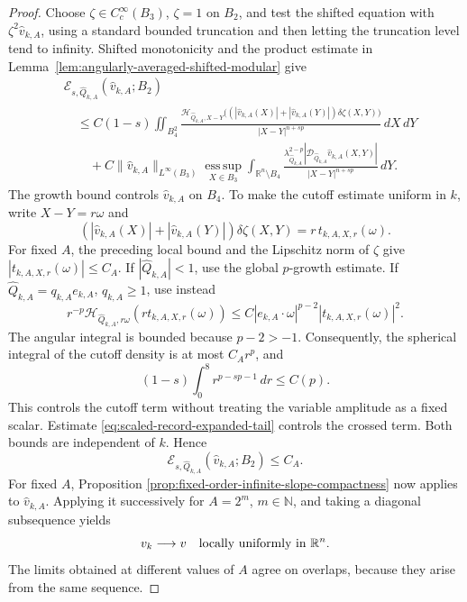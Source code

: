 \documentclass[11pt,reqno]{amsart}
\numberwithin{equation}{section}
\newcommand{\R}{\mathbb R}
\newcommand{\dd}{\,d}
\theoremstyle{remark}
\begin{document}
\begin{proof}
Choose \(\zeta\in C_c^\infty(B_3)\), \(\zeta=1\) on \(B_2\), and test
the shifted equation with
\(\zeta^2\widehat v_{k,A}\), using a standard bounded truncation and
then letting the truncation level tend to infinity.  Shifted
monotonicity and the product estimate in
Lemma~\ref{lem:angularly-averaged-shifted-modular} give
\begin{align*}
 &\mathcal E_{s,\widehat Q_{k,A}}
       (\widehat v_{k,A};B_2)\\
 &\quad\le C(1-s)
 \iint_{B_4^2}
 \frac{\mathcal H_{\widehat Q_{k,A},X-Y}
 \bigl((|\widehat v_{k,A}(X)|
       +|\widehat v_{k,A}(Y)|)\delta\zeta(X,Y)\bigr)}
 {|X-Y|^{n+sp}}\dd X\!\dd Y\\
 &\qquad+C\|\widehat v_{k,A}\|_{L^\infty(B_3)}
 {\operatorname*{ess\,sup}}_{X\in B_3}
 \int_{\R^n\setminus B_4}
 \frac{\lambda_{\widehat Q_{k,A}}^{2-p}
 |\mathcal D_{\widehat Q_{k,A}}\widehat v_{k,A}(X,Y)|}
 {|X-Y|^{n+sp}}\dd Y.
\end{align*}
The growth bound controls \(\widehat v_{k,A}\) on \(B_4\).  To make
the cutoff estimate uniform in \(k\), write \(X-Y=r\omega\) and
\[
 (|\widehat v_{k,A}(X)|+|\widehat v_{k,A}(Y)|)
 \delta\zeta(X,Y)=r\,t_{k,A,X,r}(\omega).
\]
For fixed \(A\), the preceding local bound and the Lipschitz norm of
\(\zeta\) give \(|t_{k,A,X,r}(\omega)|\le C_A\).  If
\(|\widehat Q_{k,A}|<1\), use the global \(p\)-growth estimate.  If
\(\widehat Q_{k,A}=q_{k,A}e_{k,A}\), \(q_{k,A}\ge1\), use instead
\[
 r^{-p}\mathcal H_{\widehat Q_{k,A},r\omega}
       (r t_{k,A,X,r}(\omega))
 \le C|e_{k,A}\cdot\omega|^{p-2}
       |t_{k,A,X,r}(\omega)|^2.
\]
The angular integral is bounded because \(p-2>-1\).  Consequently,
the spherical integral of the cutoff density is at most \(C_A r^p\),
and
\[
 (1-s)\int_0^8r^{p-sp-1}\dd r\le C(p).
\]
This controls the cutoff term without treating the variable amplitude
as a fixed scalar.  Estimate \eqref{eq:scaled-record-expanded-tail}
controls the crossed term.  Both bounds are independent of \(k\).
Hence
\begin{equation}
 \mathcal E_{s,\widehat Q_{k,A}}
       (\widehat v_{k,A};B_2)\le C_A.
 \label{eq:scaled-record-energy}
\end{equation}
For fixed \(A\), Proposition
\ref{prop:fixed-order-infinite-slope-compactness} now applies to
\(\widehat v_{k,A}\).  Applying it successively for \(A=2^m\),
\(m\in\mathbb N\), and taking a diagonal subsequence yields
\begin{equation}
 v_k\longrightarrow v
 \quad\hbox{locally uniformly in }\R^n.
 \label{eq:record-global-local-uniform-convergence}
\end{equation}
The limits obtained at different values of \(A\) agree on overlaps,
because they arise from the same sequence.


\end{proof}
\end{document}
